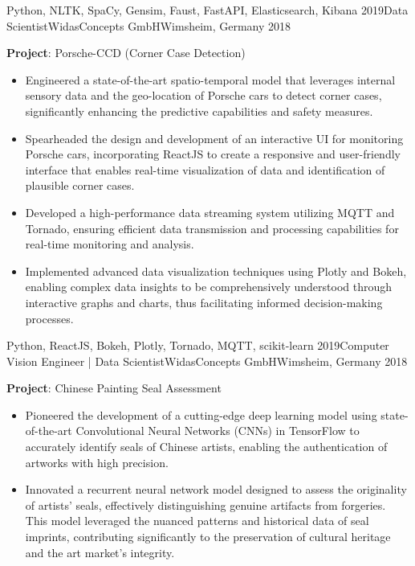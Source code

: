 \begin{experiences}
{\begin{itemize}
		\end{itemize}
	}
	{Python, NLTK, SpaCy, Gensim, Faust, FastAPI, Elasticsearch, Kibana}
	\emptySeparator
	\experience
	{2019}{Data Scientist}{WidasConcepts GmbH}{Wimsheim, Germany}
	{2018} {
		\vspace{0.1cm}
		\textbf{Project}: Porsche-CCD (Corner Case Detection)
		\begin{itemize}
			\item Engineered a state-of-the-art spatio-temporal model that leverages internal sensory data and the geo-location of Porsche cars to detect corner cases, significantly enhancing the predictive capabilities and safety measures.
			\item Spearheaded the design and development of an interactive UI for monitoring Porsche cars, incorporating ReactJS to create a responsive and user-friendly interface that enables real-time visualization of data and identification of plausible corner cases.
			\item Developed a high-performance data streaming system utilizing MQTT and Tornado, ensuring efficient data transmission and processing capabilities for real-time monitoring and analysis.
			\item Implemented advanced data visualization techniques using Plotly and Bokeh, enabling complex data insights to be comprehensively understood through interactive graphs and charts, thus facilitating informed decision-making processes.
		\end{itemize}
	}
	{Python, ReactJS, Bokeh, Plotly, Tornado, MQTT, scikit-learn}
	\emptySeparator
	\experience
	{2019}{Computer Vision Engineer | Data Scientist}{WidasConcepts GmbH}{Wimsheim, Germany}
	{2018} {
		\vspace{0.1cm}
		\textbf{Project}: Chinese Painting Seal Assessment
		\begin{itemize}
			\item Pioneered the development of a cutting-edge deep learning model using state-of-the-art Convolutional Neural Networks (CNNs) in TensorFlow to accurately identify seals of Chinese artists, enabling the authentication of artworks with high precision.
			\item Innovated a recurrent neural network model designed to assess the originality of artists' seals, effectively distinguishing genuine artifacts from forgeries. This model leveraged the nuanced patterns and historical data of seal imprints, contributing significantly to the preservation of cultural heritage and the art market's integrity.


\end{itemize}}
\end{experiences}
